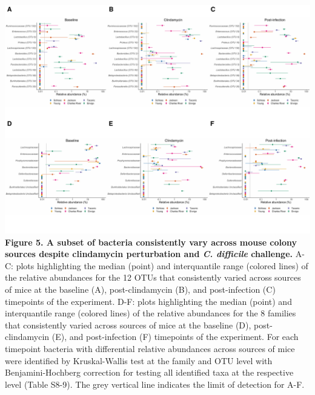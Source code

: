 \documentclass[11pt,]{article}
\begin{document}
\includegraphics{figure_5.pdf} \textbf{Figure 5. A subset of bacteria
consistently vary across mouse colony sources despite clindamycin
perturbation and \emph{C. difficile} challenge.} A-C: plots highlighting
the median (point) and interquantile range (colored lines) of the
relative abundances for the 12 OTUs that consistently varied across
sources of mice at the baseline (A), post-clindamycin (B), and
post-infection (C) timepoints of the experiment. D-F: plots highlighting
the median (point) and interquantile range (colored lines) of the
relative abundances for the 8 families that consistently varied across
sources of mice at the baseline (D), post-clindamycin (E), and
post-infection (F) timepoints of the experiment. For each timepoint
bacteria with differential relative abundances across sources of mice
were identified by Kruskal-Wallis test at the family and OTU level with
Benjamini-Hochberg correction for testing all identified taxa at the
respective level (Table S8-9). The grey vertical line indicates the
limit of detection for A-F.

\newpage
\end{document}
